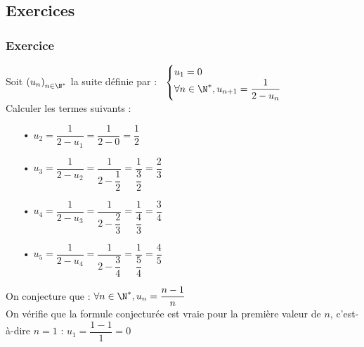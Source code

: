 \newpage

\vspace*{-2cm}

\subsection{Exercices}

\subsubsection{Exercice }

Soit $\left(u_n\right)_{n \in \N^*}$ la suite définie par :$ \; \; \; \begin{cases}
u_1 = 0 \\
\forall n \in \N^*, u_{n+1} = \dfrac{1}{2 - u_n} \\
\end{cases}$ \\

Calculer les termes suivants : \\

\begin{itemize}
\item[•] $u_2 = \dfrac{1}{2 - u_1} = \dfrac{1}{2 - 0} = \dfrac{1}{2}$ \vspace*{.3cm} \\
\item[•] $ u_3 = \dfrac{1}{2 - u_2} = \dfrac{1}{2 - \dfrac{1}{2}} = \dfrac{1}{\dfrac{3}{2}} = \dfrac{2}{3}$ \vspace*{.3cm} \\
\item[•] $u_4 = \dfrac{1}{2 - u_3} = \dfrac{1}{2 - \dfrac{2}{3}} = \dfrac{1}{\dfrac{4}{3}} = \dfrac{3}{4}$ \vspace*{.3cm} \\
\item[•] $u_5 = \dfrac{1}{2 - u_4} = \dfrac{1}{2 - \dfrac{3}{4}} = \dfrac{1}{\dfrac{5}{4}} = \dfrac{4}{5}$ \vspace*{.3cm} \\
\end{itemize}

\vspace*{.3cm}

On conjecture que : $\forall n \in \N^*, u_n = \dfrac{n - 1}{n}$ \\

On vérifie que la formule conjecturée est vraie pour la première valeur de $n$, c'est-à-dire $n = 1$ : $u_1 = \dfrac{1 - 1}{1} = 0$ \\

